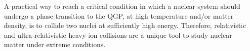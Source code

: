 A practical way to reach a critical condition in which a nuclear system should undergo a phase transition to the QGP, at high temperature and/or matter density, is to collide two nuclei at sufficiently high energy. Therefore, relativistic and ultra-relativistic heavy-ion collisions are a unique tool to study nuclear matter under extreme conditions.





\newpage